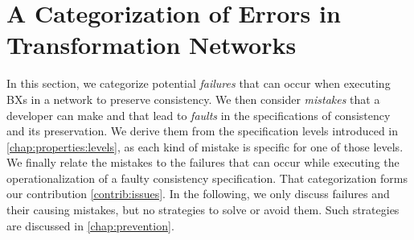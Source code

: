 \chapter{A Categorization of Errors in Transformation Networks
}
\label{chap:errors}


In this section, we %
categorize potential \emph{failures} that can occur when executing \acp{BX} in a network to preserve consistency.
We then consider \emph{mistakes} that a developer can make and that lead to \emph{faults} in the specifications of consistency and its preservation.
We derive them from the specification levels introduced in \autoref{chap:properties:levels}, as each kind of mistake is specific for one of those levels.
We finally relate the mistakes to the failures that can occur while executing the operationalization of a faulty consistency specification.
That categorization forms our contribution \ref{contrib:issues}.
In the following, we only discuss failures and their causing mistakes, but no strategies to solve or avoid them.
Such strategies are discussed in \autoref{chap:prevention}.



